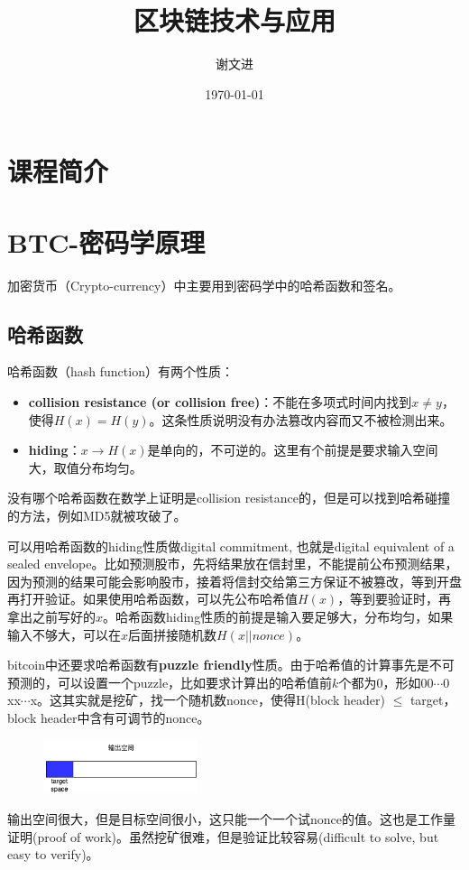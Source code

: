 \documentclass[10pt]{ctexart}
\title{区块链技术与应用}
\author{谢文进}
\date{\today}
\begin{document}
\maketitle
\tableofcontents
\section{课程简介}
 
\section{BTC-密码学原理}
加密货币（Crypto-currency）中主要用到密码学中的哈希函数和签名。
\subsection{哈希函数}
哈希函数（hash function）有两个性质：
\begin{itemize}
    \item \textbf{collision resistance (or collision free)}：不能在多项式时间内找到$x \neq y$，使得$H(x)=H(y)$。这条性质说明没有办法篡改内容而又不被检测出来。
    \item \textbf{hiding}：$x \rightarrow H(x)$是单向的，不可逆的。这里有个前提是要求输入空间大，取值分布均匀。
\end{itemize}
没有哪个哈希函数在数学上证明是collision resistance的，但是可以找到哈希碰撞的方法，例如MD5就被攻破了。

可以用哈希函数的hiding性质做digital commitment, 也就是digital equivalent of a sealed envelope。比如预测股市，先将结果放在信封里，不能提前公布预测结果，因为预测的结果可能会影响股市，接着将信封交给第三方保证不被篡改，等到开盘再打开验证。如果使用哈希函数，可以先公布哈希值$H(x)$，等到要验证时，再拿出之前写好的$x$。哈希函数hiding性质的前提是输入要足够大，分布均匀，如果输入不够大，可以在$x$后面拼接随机数$H(x||nonce)$。

bitcoin中还要求哈希函数有\textbf{puzzle friendly}性质。由于哈希值的计算事先是不可预测的，可以设置一个puzzle，比如要求计算出的哈希值前$k$个都为0，形如$00\cdots 0 $xx$\cdots$x。这其实就是挖矿，找一个随机数nonce，使得H(block header) $\le$ target，block header中含有可调节的nonce。
\begin{figure}[H]
    \centering
    \includegraphics[width=0.4\textwidth]{./lecture2/lecture1-1.png} 
\end{figure}
输出空间很大，但是目标空间很小，这只能一个一个试nonce的值。这也是工作量证明(proof of work)。虽然挖矿很难，但是验证比较容易(difficult to solve, but easy to verify)。
\end{document}
